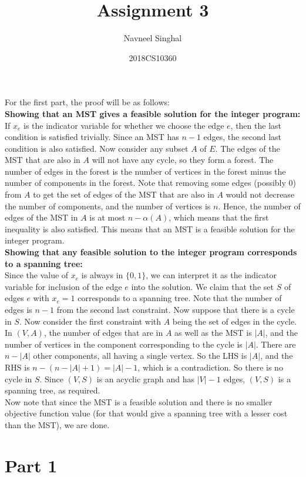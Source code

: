 \documentclass[a4paper]{article}
\title{\textbf{Assignment 3}}
\author{Navneel Singhal}
\date{2018CS10360}
\newcommand{\nl}{\vspace{0.2cm}\\}
\begin{document}
\maketitle

For the first part, the proof will be as follows:\nl
\textbf{Showing that an MST gives a feasible solution for the integer program:}\nl
If $x_e$ is the indicator variable for whether we choose the edge $e$, then the last condition is satisfied trivially. Since an MST has $n - 1$ edges, the second last condition is also satisfied.
Now consider any subset $A$ of $E$. The edges of the MST that are also in $A$ will not have any cycle, so they form a forest. The number of edges in the forest is the number of vertices in the
forest minus the number of components in the forest. Note that removing some edges (possibly 0) from $A$ to get the set of edges of the MST that are also in $A$ would not decrease the number of
components, and the number of vertices is $n$. Hence, the number of edges of the MST in $A$ is at most $n - \alpha(A)$, which means that the first inequality is also satisfied. This means that
an MST is a feasible solution for the integer program.\nl

\textbf{Showing that any feasible solution to the integer program corresponds to a spanning tree:}\nl
Since the value of $x_e$ is always in $\{0, 1\}$, we can interpret it as the indicator variable for inclusion of the edge $e$ into the solution. We claim that the set $S$ of edges $e$ with $x_e =
1$ corresponds to a spanning tree. Note that the number of edges is $n - 1$ from the second last constraint. Now suppose that there is a cycle in $S$. Now consider the first constraint with $A$
being the set of edges in the cycle. In $(V, A)$, the number of edges that are in $A$ as well as the MST is $|A|$, and the number of vertices in the component corresponding to the cycle is $|A|$. There are $n - |A|$ other
components, all having a single vertex. So the LHS is $|A|$, and the RHS is $n - (n - |A| + 1) = |A| - 1$, which is a contradiction. So there is no cycle in $S$. Since $(V, S)$ is an acyclic graph
and has $|V| - 1$ edges, $(V, S)$ is a spanning tree, as required.\nl

Now note that since the MST is a feasible solution and there is no smaller objective function value (for that would give a spanning tree with a lesser cost than the MST), we are done.

\section{Part 1}
\end{document}
